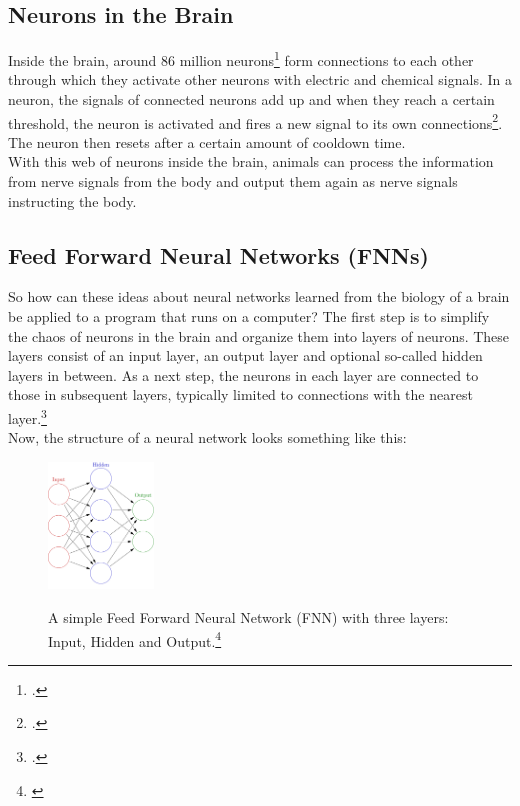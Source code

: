 \documentclass[11pt]{report}
\begin{document}
    \subsection{Neurons in the Brain}\label{subsec:neurons-in-the-brain}
    Inside the brain, around 86 million neurons\footcite{caruso_23} form connections to each other through which they activate other neurons with electric and chemical signals.
    In a neuron, the signals of connected neurons add up and when they reach a certain threshold, the neuron is activated and fires a new signal to its own connections\footcite{Newman_23}.
    The neuron then resets after a certain amount of cooldown time.
    \\
    With this web of neurons inside the brain, animals can process the information from nerve signals from the body and output them again as nerve signals instructing the body.

    \subsection{Feed Forward Neural Networks (FNNs)}\label{subsec:feed-forward-neural-networks-(fnns)}
    So how can these ideas about neural networks learned from the biology of a brain be applied to a program that runs on a computer?
    The first step is to simplify the chaos of neurons in the brain and organize them into layers of neurons.
    These layers consist of an input layer, an output layer and optional so-called hidden layers in between.
    As a next step, the neurons in each layer are connected to those in subsequent layers, typically limited to connections with the nearest layer.\footcite{Hardesty2017}
    \\
    Now, the structure of a neural network looks something like this:
    \begin{figure}[H]
        \centering
        \includegraphics[width=0.25\textwidth]{nn_simple_1}~\caption{A simple Feed Forward Neural Network (FNN) with three layers: Input, Hidden and Output.\footnote{\cite{nn_simple_img_1}}}
        \label{fig:nn_simple_1}
    \end{figure}
\end{document}

